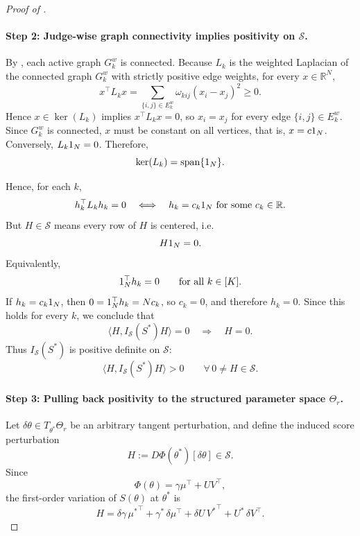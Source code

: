 \documentclass{article}
\begin{document}
\begin{bibunit}[unsrtnat]
\begin{proof}[Proof of ]
\paragraph{Step 2: Judge-wise graph connectivity implies positivity on \(\mathcal S\).}
By , each active graph \(G_k^w\) is connected.
Because \(L_k\) is the weighted Laplacian of the connected graph \(G_k^w\) with strictly positive edge weights, for every \(x\in\mathbb R^N\),
\[
x^\top L_k x=\sum_{\{i,j\}\in E_k^w}\omega_{kij}(x_i-x_j)^2 \ge 0.
\]
Hence \(x\in\ker(L_k)\) implies \(x^\top L_k x=0\), so \(x_i=x_j\) for every edge \(\{i,j\}\in E_k^w\). Since \(G_k^w\) is connected, \(x\) must be constant on all vertices,
that is, \(x=c1_N\). Conversely, \(L_k1_N=0\). Therefore,
\[
\ker(L_k)=\mathrm{span}\{1_N\}.
\]

Hence, for each \(k\),
\[
h_k^\top L_k h_k=0\quad\Longleftrightarrow\quad h_k=c_k 1_N
\text{ for some }c_k\in\mathbb R.
\]
But \(H\in\mathcal S\) means every row of \(H\) is centered, i.e.
\[
H1_N=0.
\]
Equivalently,
\[
1_N^\top h_k=0 \qquad\text{for all }k\in[K].
\]
If \(h_k=c_k1_N\), then \(0=1_N^\top h_k = Nc_k\), so \(c_k=0\), and therefore \(h_k=0\).
Since this holds for every \(k\), we conclude that
\[
\langle H, I_{\mathcal S}(S^*)H\rangle=0
\quad\Longrightarrow\quad
H=0.
\]
Thus \(I_{\mathcal S}(S^*)\) is positive definite on \(\mathcal S\):
\begin{equation}
\label{eq:score_PD}
\langle H, I_{\mathcal S}(S^*)H\rangle>0
\qquad
\forall\, 0\neq H\in\mathcal S.
\end{equation}

\paragraph{Step 3: Pulling back positivity to the structured parameter space $\Theta_r$.}
Let \(\delta\theta\in T_{\theta^*}\Theta_r\) be an arbitrary tangent perturbation, and define the induced score perturbation
\[
H:=D\Phi(\theta^*)[\delta\theta]\in\mathcal S.
\]
Since
\[
\Phi(\theta)=\gamma\mu^\top + UV^\top,
\]
the first-order variation of \(S(\theta)\) at \(\theta^*\) is
\begin{equation}
\label{eq:dPhi_expansion}
H
=
\delta\gamma\,{\mu^*}^\top
+
\gamma^*\,\delta\mu^\top
+
\delta U\,{V^*}^\top
+
U^*\,\delta V^\top.
\end{equation}


\end{proof}
\end{bibunit}
\end{document}
